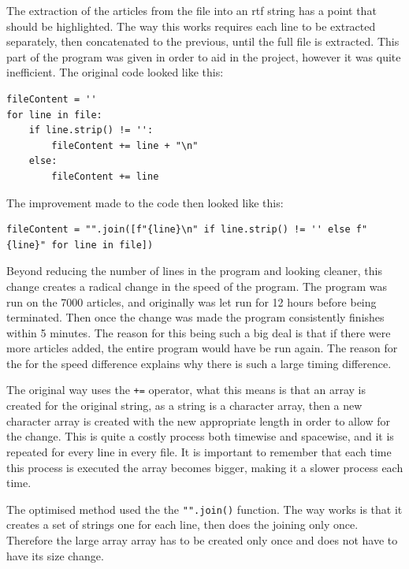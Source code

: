 The extraction of the articles from the file into an rtf string has a point that should be highlighted. The way this works requires each line to be extracted separately, then concatenated to the previous, until the full file is extracted. This part of the program was given in order to aid in the project, however it was quite inefficient. The original code looked like this:
\begin{lstlisting}[caption=Slow Text Extraction]
fileContent = ''
for line in file:
    if line.strip() != '':
        fileContent += line + "\n"
    else:
        fileContent += line
\end{lstlisting}
The improvement made to the code then looked like this:
\begin{lstlisting}[caption=Optimised Text Extraction]
fileContent = "".join([f"{line}\n" if line.strip() != '' else f"{line}" for line in file])
\end{lstlisting}
Beyond reducing the number of lines in the program and looking cleaner, this change creates a radical change in the speed of the program. The program was run on the 7000 articles, and originally was let run for 12 hours before being terminated. Then once the change was made the program consistently finishes within 5 minutes. The reason for this being such a big deal is that if there were more articles added, the entire program would have be run again. The reason for the for the speed difference explains why there is such a large timing difference.

The original way uses the \verb|+=| operator, what this means is that an array is created for the original string, as a string is a character array, then a new character array is created with the new appropriate length in order to allow for the change. This is quite a costly process both timewise and spacewise, and it is repeated for every line in every file. It is important to remember that each time this process is executed the array becomes bigger, making it a slower process each time.

The optimised method used the the \verb|"".join()| function. The way works is that it creates a set of strings one for each line, then does the joining only once. Therefore the large array array has to be created only once and does not have to have its size change.

